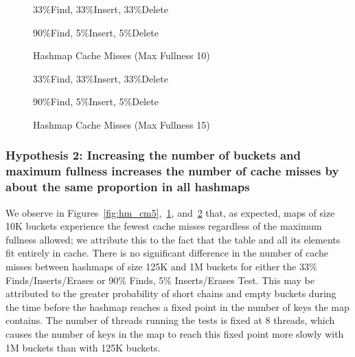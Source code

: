     \begin{figure}[H]
    \centering
        \begin{minipage}{0.75\textwidth}
        \centering
            \caption*{33\%Find, 33\%Insert, 33\%Delete}
            \vspace{12pt}
        \end{minipage}
        \begin{minipage}{0.75\textwidth}
            \centering
            \caption*{90\%Find, 5\%Insert, 5\%Delete}
        \end{minipage}
        \caption{Hashmap Cache Misses (Max Fullness 10)}
		\label{fig:hm_cm10}
    \end{figure}

    \begin{figure}[H]
    \centering
        \begin{minipage}{0.75\textwidth}
        \centering
            \caption*{33\%Find, 33\%Insert, 33\%Delete}
            \vspace{12pt}
        \end{minipage}
        \begin{minipage}{0.75\textwidth}
            \centering
            \caption*{90\%Find, 5\%Insert, 5\%Delete}
        \end{minipage}
        \caption{Hashmap Cache Misses (Max Fullness 15)}
		\label{fig:hm_cm15}
    \end{figure}


\subsubsection{Hypothesis 2: Increasing the number of buckets and maximum fullness increases the number of cache misses by about the same proportion in all hashmaps}

We observe in Figures~\ref{fig:hm_cm5},~\ref{fig:hm_cm10}, and~\ref{fig:hm_cm15} that, as expected, maps of size 10K buckets experience the fewest cache misses regardless of the maximum fullness allowed; we attribute this to the fact that the table and all its elements fit entirely in cache. There is no significant difference in the number of cache misses between hashmaps of size 125K and 1M buckets for either the 33\% Finds/Inserts/Erases  or 90\% Finds, 5\% Inserts/Erases Test. This may be attributed to the greater probability of short chains and empty buckets during the time before the hashmap reaches a fixed point in the number of keys the map contains. The number of threads running the tests is fixed at 8 threads, which causes the number of keys in the map to reach this fixed point more slowly with 1M buckets than with 125K buckets.

